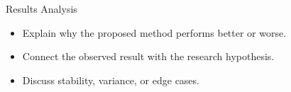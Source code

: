\begin{frame}{Results Analysis}

\begin{itemize}
    \item Explain why the proposed method performs better or worse.
    \item Connect the observed result with the research hypothesis.
    \item Discuss stability, variance, or edge cases.
\end{itemize}

\end{frame}
